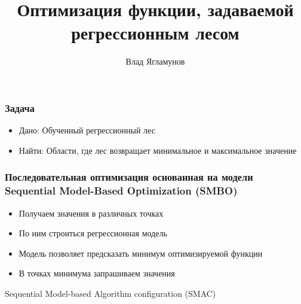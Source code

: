 \documentclass{beamer}
\title{Оптимизация функции, задаваемой регрессионным лесом}
\author{Влад Ягламунов}
\date{}
\begin{document}
\maketitle

\begin{frame}
    \frametitle{Задача}
    \begin{itemize}
            \item Дано: Обученный регрессионный лес
            \item Найти: Области, где лес возвращает минимальное и максимальное значение
    \end{itemize}
\end{frame}

\begin{frame}
    \frametitle{Последовательная оптимизация основанная на модели Sequential Model-Based Optimization (SMBO)}
    \begin{itemize}
            \item Получаем значения в различных точках 
            \item По ним строиться регрессионная модель
            \item Модель позволяет предсказать минимум оптимизируемой функции
            \item В точках минимума запрашиваем значения
    \end{itemize}
    \vfill
    Sequential Model-based Algorithm configuration (SMAC)
\end{frame}
\end{document}

